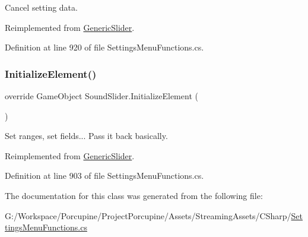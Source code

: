 Cancel setting data. 



Reimplemented from \hyperlink{class_generic_slider_ab22180d2e9abdb678b9797956224651c}{Generic\+Slider}.



Definition at line 920 of file Settings\+Menu\+Functions.\+cs.

\mbox{\label{class_sound_slider_a49202c614f0626d21bf6d086090c0720}} 
\subsubsection{\texorpdfstring{Initialize\+Element()}{InitializeElement()}}
{\footnotesize\ttfamily override Game\+Object Sound\+Slider.\+Initialize\+Element (\begin{DoxyParamCaption}{ }\end{DoxyParamCaption})\hspace{0.3cm}{\ttfamily [virtual]}}



Set ranges, set fields... Pass it back basically. 



Reimplemented from \hyperlink{class_generic_slider_afcfeee7d737e3cfc793739021a75e67c}{Generic\+Slider}.



Definition at line 903 of file Settings\+Menu\+Functions.\+cs.



The documentation for this class was generated from the following file\+:\begin{DoxyCompactItemize}
\item 
G\+:/\+Workspace/\+Porcupine/\+Project\+Porcupine/\+Assets/\+Streaming\+Assets/\+C\+Sharp/\hyperlink{_settings_menu_functions_8cs}{Settings\+Menu\+Functions.\+cs}\end{DoxyCompactItemize}
